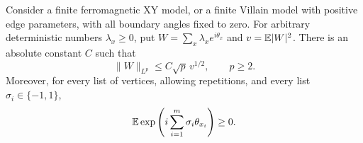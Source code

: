 \begin{lemma}\label{vi:lee-yang}
Consider a finite ferromagnetic XY model, or a finite Villain model with
positive edge parameters, with all boundary angles fixed to zero.
For arbitrary deterministic numbers $\lambda_x\geq0$, put
$W=\sum_x\lambda_x e^{i\theta_x}$ and $v=\mathbb E|W|^2$.
There is an absolute constant $C$ such that
\begin{equation}\label{vi:ly-absolute}
 \|W\|_{L^p}\leq C\sqrt p\,v^{1/2},\qquad p\geq2.
\end{equation}
Moreover, for every list of vertices, allowing repetitions, and every list
$\sigma_i\in\{-1,1\}$,
\begin{equation}\label{vi:positive-spin-moments}
 \mathbb E\exp\left(i\sum_{i=1}^m\sigma_i\theta_{x_i}\right)\geq0.
\end{equation}
\end{lemma}

